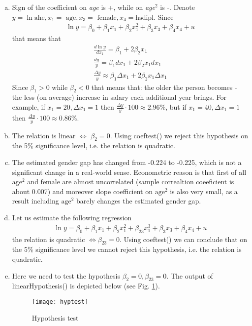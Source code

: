 \documentclass[a4paper]{article}
\begin{document}
\begin{enumerate}[(a)]
	\item Sign of the coefficient on \textit{age} is +, while on \textit{age}$^2$ is -. Denote $y = \ln \text{ahe}, x_1 = \text{ age}, x_3 = \text{ female}, x_4 = \text{hsdipl}$. Since 
	\begin{align*}
	\ln y = \beta_0 + \beta_1x_1 + \beta_2x_1^2 + \beta_3x_3 + \beta_4x_4 +u
	\end{align*}
	that means that
	\begin{align*}
	\frac{d \ln y}{d x_1} = \beta_1 + 2\beta_2x_1\\
	\frac{dy}{y} = \beta_1dx_1 + 2\beta_2 x_1 dx_1 \\
	\frac{\Delta y}{y} \approx \beta_1\Delta x_1 + 2\beta_2 x_1 \Delta x_1
	\end{align*}
	Since $\beta_1 > 0$ while $\beta_2 < 0$ that means that: the older the person becomes - the less (on average) increase in salary each additional year brings. For example, if $x_1 = 20, \Delta x_1 = 1$ then $\frac{\Delta y}{y} \cdot 100 \approx 2.96 \%$, but if $x_1 = 40, \Delta x_1 = 1$ then $\frac{\Delta y}{y} \cdot 100 \approx 0.86 \%$.
	\item The relation is linear $\iff$ $\beta_2 = 0$. Using coeftest() we reject this hypothesis on the 5\% significance level, i.e. the relation is quadratic.
	\item The estimated gender gap has changed from -0.224 to -0.225, which is not a significant change in a real-world sense. Econometric reason is that first of all $\text{age}^2$ and $\text{female}$ are almost uncorrelated (sample correaltion coeeficient is about 0.007) and moreover slope coefficient on $\text{age}^2$ is also very small, as a result including $\text{age}^2$ barely changes the estimated gender gap.
	\item Let us estimate the following regression
	\begin{align*}
	\ln y = \beta_0 + \beta_1x_1 + \beta_2x_1^2 + \beta_{23}x_1^3+ \beta_3x_3 + \beta_4x_4 +u
	\end{align*}
	the relation is quadratic $\iff \beta_{23} = 0$. Using coeftest() we can conclude that on the 5\% significance level we cannot reject this hypothesis, i.e. the relation is quadratic.
	\item Here we need to test the hypothesis $\beta_2 = 0, \beta_{23} = 0$. The output of linearHypothesis() is depicted below (see Fig. \ref{fig3}).
	
	\begin{figure}[h]
		\centering
		\texttt{[image: hyptest]}
		\caption{Hypothesis test}\label{fig3}
	\end{figure}



\end{enumerate}
\end{document}
